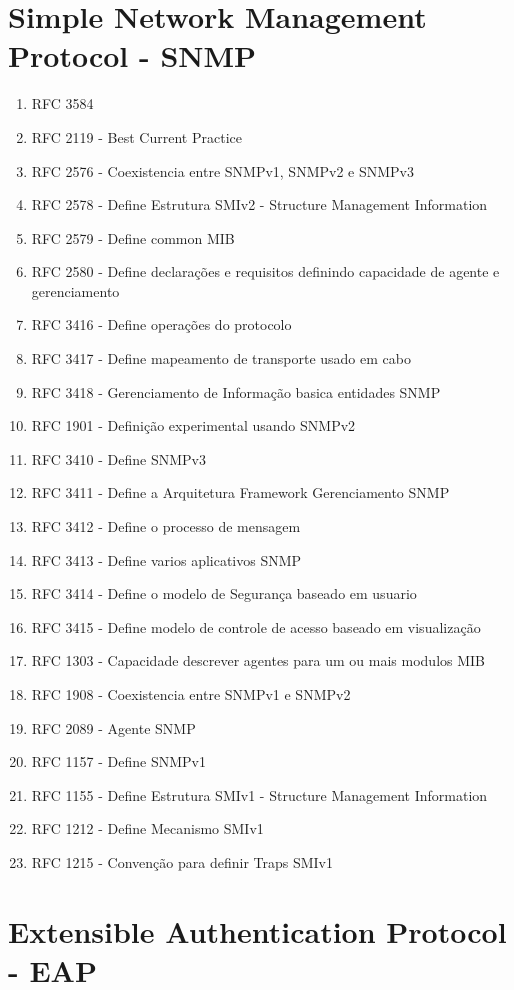 \documentclass[brazil, ruledheader, pnumromarab,normaltoc]{abnt}
\begin{document}
\section{Simple Network Management Protocol - SNMP}
\begin{enumerate}
\item RFC 3584\cite{rfc-3584-}
\item RFC 2119 - Best Current Practice
\item RFC 2576 - Coexistencia entre SNMPv1, SNMPv2 e SNMPv3\cite{rfc-2576}
\item RFC 2578 - Define Estrutura SMIv2 - Structure Management Information
\item RFC 2579 - Define common MIB
\item RFC 2580 - Define declarações e requisitos definindo capacidade de agente e gerenciamento
\item RFC 3416 - Define operações do protocolo
\item RFC 3417 - Define mapeamento de transporte usado em cabo
\item RFC 3418 - Gerenciamento de Informação basica entidades SNMP
\item RFC 1901 - Definição experimental usando SNMPv2
\item RFC 3410 - Define SNMPv3
\item RFC 3411 - Define a Arquitetura Framework Gerenciamento SNMP
\item RFC 3412 - Define o processo de mensagem
\item RFC 3413 - Define varios aplicativos SNMP
\item RFC 3414 - Define o modelo de Segurança baseado em usuario
\item RFC 3415 - Define modelo de controle de acesso baseado em visualização
\item RFC 1303 - Capacidade descrever agentes para um ou mais modulos MIB
\item RFC 1908 - Coexistencia entre SNMPv1 e SNMPv2
\item RFC 2089 - Agente SNMP

\item RFC 1157 - Define SNMPv1
\item RFC 1155 - Define Estrutura SMIv1 - Structure Management Information
\item RFC 1212 - Define Mecanismo SMIv1 
\item RFC 1215 - Convenção para definir Traps SMIv1
\end{enumerate}

\section{Extensible Authentication Protocol - EAP}
\end{document}
